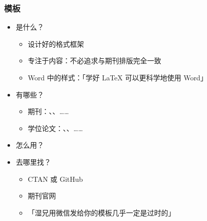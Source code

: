 \begin{frame}[fragile]
\frametitle{模板}
\begin{itemize}
  \item<+-> 是什么？

    \begin{itemize}
      \item 设计好的格式框架
      \item 专注于内容：\alert{不必追求与期刊排版完全一致}
      \item Word 中的样式：「学好 \LaTeX{} 可以更科学地使用 Word」
    \end{itemize}

  \item<+-> 有哪些？

    \begin{itemize}
      \item 期刊：、、……
      \item 学位论文：、、\alert{}……
    \end{itemize}

  \item<+-> 怎么用？


  \item<+-> 去哪里找？

    \begin{itemize}
      \item CTAN  或 GitHub \href{https://github.com}{\faGithub}
      \item 期刊官网
      \item 「湿兄用微信发给你的模板几乎一定是过时的」
    \end{itemize}
\end{itemize}
\end{frame}

